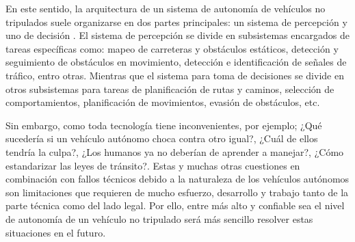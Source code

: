 En este sentido, la arquitectura de un sistema de autonomía de vehículos no tripulados suele organizarse en dos partes principales: un sistema de percepción y uno de decisión \cite{paden2016survey}. El sistema de percepción se divide en subsistemas encargados de tareas específicas como: mapeo de carreteras y obstáculos estáticos, detección y seguimiento de obstáculos en movimiento, detección e identificación de señales de tráfico, entro otras. Mientras que el sistema para toma de decisiones se divide en otros subsistemas para tareas de planificación de rutas y caminos, selección de comportamientos, planificación de movimientos, evasión de obstáculos, etc.

Sin embargo, como toda tecnología tiene inconvenientes, por ejemplo; ¿Qué sucedería si un vehículo autónomo choca contra otro igual?, ¿Cuál de ellos tendría la culpa?, ¿Los humanos ya no deberían de aprender a manejar?, ¿Cómo estandarizar las leyes de tránsito?. Estas y muchas otras cuestiones en combinación con fallos técnicos debido a la naturaleza de los vehículos autónomos son limitaciones que requieren de mucho esfuerzo, desarrollo y trabajo tanto de la parte técnica como del lado legal. Por ello, entre más alto y confiable sea el nivel de autonomía de un vehículo no tripulado será más sencillo resolver estas situaciones en el futuro.










